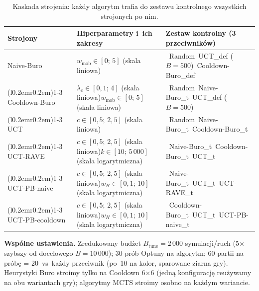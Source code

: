 \documentclass[11pt,a4paper]{article}
\begin{document}
\newcommand{\opp}{{\scriptsize\textbullet}~}
\newcommand{\opps}[3]{\opp #1\newline\opp #2\newline\opp #3}
\newcommand{\hpA}[1]{#1}
\newcommand{\hpB}[2]{#1\newline#2}

\begin{table}[h]
\centering
\small
\renewcommand{\arraystretch}{1.2}
\begin{tabularx}{\linewidth}{@{}l X X@{}}
\toprule
\textbf{Strojony} & \textbf{Hiperparametry i~ich zakresy} & \textbf{Zestaw kontrolny (3 przeciwników)} \\
\midrule
Naive-Buro       & \hpA{$w_{\text{mob}} \in [0;\, 5]$ (skala liniowa)}                                                            & \opps{Random}{UCT\_def ($B{=}500$)}{Cooldown-Buro\_def} \\
\cmidrule(l{0.2em}r{0.2em}){1-3}
Cooldown-Buro    & \hpB{$\lambda_c \in [0{,}1;\, 4]$ (skala liniowa)}{$w_{\text{mob}} \in [0;\, 5]$ (skala liniowa)}              & \opps{Random}{Naive-Buro\_t}{UCT\_def ($B{=}500$)} \\
\cmidrule(l{0.2em}r{0.2em}){1-3}
UCT              & \hpA{$c \in [0{,}5;\, 2{,}5]$ (skala liniowa)}                                                                 & \opps{Random}{Naive-Buro\_t}{Cooldown-Buro\_t} \\
\cmidrule(l{0.2em}r{0.2em}){1-3}
UCT-RAVE         & \hpB{$c \in [0{,}5;\, 2{,}5]$ (skala liniowa)}{$k \in [10;\, 5\,000]$ (skala logarytmiczna)}                   & \opps{Naive-Buro\_t}{Cooldown-Buro\_t}{UCT\_t} \\
\cmidrule(l{0.2em}r{0.2em}){1-3}
UCT-PB-naive     & \hpB{$c \in [0{,}5;\, 2{,}5]$ (skala liniowa)}{$w_H \in [0{,}1;\, 10]$ (skala logarytmiczna)}                  & \opps{Naive-Buro\_t}{UCT\_t}{UCT-RAVE\_t} \\
\cmidrule(l{0.2em}r{0.2em}){1-3}
UCT-PB-cooldown  & \hpB{$c \in [0{,}5;\, 2{,}5]$ (skala liniowa)}{$w_H \in [0{,}1;\, 10]$ (skala logarytmiczna)}                  & \opps{Cooldown-Buro\_t}{UCT\_t}{UCT-PB-naive\_t} \\
\bottomrule
\end{tabularx}
\caption{Kaskada strojenia: każdy algorytm trafia do zestawu kontrolnego wszystkich strojonych po nim.}
\label{tab:tuning}
\end{table}

\textbf{Wspólne ustawienia.} Zredukowany budżet $B_{\text{tune}} = 2\,000$ symulacji/ruch (5$\times$ szybszy od docelowego $B=10\,000$); 30 prób Optuny na algorytm; 60 partii na próbę = 20~vs~każdy przeciwnik (po~10 na kolor, sparowane ziarna gry). Heurystyki Buro stroimy tylko na Cooldown 6$\times$6 (jedną konfigurację reużywamy na obu wariantach gry); algorytmy MCTS stroimy osobno na każdym wariancie.
\end{document}
